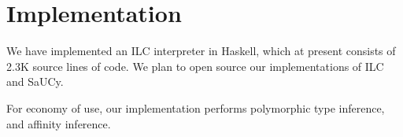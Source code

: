 \section{Implementation}
\label{sec:implementation}

We have implemented an ILC interpreter in Haskell, which at present consists of
2.3K source lines of code. We plan to open source our implementations of ILC and
SaUCy.

For economy of use, our implementation performs polymorphic type inference, and
affinity inference.

%
%
%
%
